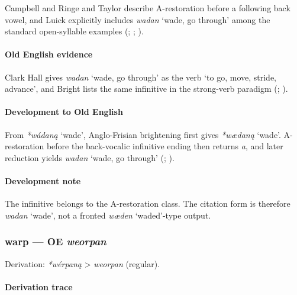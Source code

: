 \documentclass[
  british,
  a4paper,
]{article}
\providecommand{\Recon}[1]{\emph{*#1}}
\begin{document}
Campbell and Ringe and Taylor describe A-restoration before a following
back vowel, and Luick explicitly includes {\emph{wadan}} `wade, go
through' among the standard open-syllable examples
(;
;
).

\paragraph{Old English evidence}\label{old-english-evidence-72}

Clark Hall gives {\emph{wadan}} `wade, go through' as the verb `to go,
move, stride, advance', and Bright lists the same infinitive in the
strong-verb paradigm (;
).

\paragraph{Development to Old
English}\label{development-to-old-english-71}

From \Recon{wádaną} `wade', Anglo-Frisian brightening first gives
\Recon{wædaną} `wade'. A-restoration before the back-vocalic infinitive
ending then returns \emph{a}, and later reduction yields {\emph{wadan}}
`wade, go through' (;
).

\paragraph{Development note}\label{development-note-2}

The infinitive belongs to the A-restoration class. The citation form is
therefore \emph{wadan} `wade', not a fronted \emph{wæden} `waded'-type
output.

\subsubsection{\texorpdfstring{warp --- OE
\emph{weorpan}}{warp --- OE weorpan}}\label{warp-oe-weorpan}

Derivation: \emph{*wérpaną} \textgreater{} \emph{weorpan} (regular).

\paragraph{Derivation trace}\label{derivation-trace-90}
\end{document}
